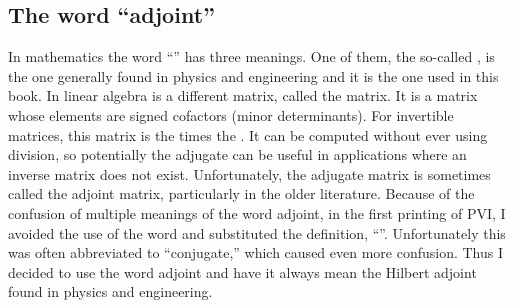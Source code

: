 \subsection{The word ``adjoint''}
In mathematics the word ``'' has three meanings.
One of them, the so-called ,
is the one generally found in physics and engineering
and it is the one used in this book.
In linear algebra is a different matrix,
called the  matrix.
It is a matrix whose elements
are signed cofactors (minor determinants).
For invertible matrices,
this matrix is the  times the .
It can be computed without ever using division,
so potentially the adjugate can be useful in applications
where an inverse matrix does not exist.
Unfortunately, the adjugate matrix is sometimes called the adjoint matrix,
particularly in the older literature.
Because of the confusion of multiple meanings of the word adjoint,
in the first printing of PVI, I avoided the use of the word and
substituted the definition, ``''.
Unfortunately this was often abbreviated to ``conjugate,''
which caused even more confusion.
Thus I decided to use the word adjoint
and have it always mean the Hilbert adjoint
found in physics and engineering.

